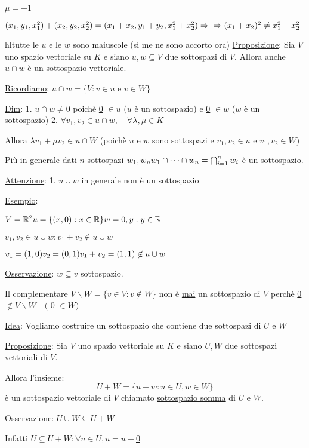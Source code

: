\documentclass{article}
\begin{document}
   $\mu=-1$

   $(x_1,y_1,x_1^2)+(x_2,y_2,x_2^2)=(x_1+x_2,y_1+y_2,x_1^2+x_2^2)\Rightarrow\\\Rightarrow(x_1+x_2)^2\not=x_1^2+x_2^2$

hl{tutte le $u$ e le $w$ sono maiuscole (si me ne sono accorto ora)}
\ul{Proposizione}: Sia $V$ uno spazio vettoriale su $K$ e siano $u,w\subseteq V$ due sottospazi di $V$. Allora anche $u\cap w$ è un sottospazio vettoriale.

\ul{Ricordiamo}: $u\cap w=\{V:v\in u$ e $v\in W\}$

\ul{Dim}:
1. $u\cap w\not=0$ poichè \ul{0} $\in u$ ($u$ è un sottospazio) e \ul{0} $\in w$ ($w$ è un sottospazio)
2. $\forall v_1,v_2\in u\cap w,\quad\forall\lambda,\mu\in K$

   Allora $\lambda v_1+\mu v_2\in u\cap W$ (poichè $u$ e $w$ sono sottospazi e $v_1,v_2\in u$ e $v_1,v_2\in W$)

Più in generale dati $n$ sottospazi $w_1,w_n\\w_1\cap\cdots\cap w_n=\bigcap^n_{i=1}w_i$ è un sottospazio.

\ul{Attenzione}:
1. $u\cup w$ in generale non è un sottospazio

   \ul{Esempio}:

   $V=\mathbb{R}^2\\u=\{(x,0):x\in\mathbb{R}\}\\w={0,y}:y\in\mathbb{R}$

   $v_1,v_2\in u\cup w:v_1+v_2\not\in u\cup w$

   $v_1=(1,0)\\v_2=(0,1)\\v_1+v_2=(1,1)\not\in u\cup w$

\ul{Osservazione}: $w\subseteq v$ sottospazio.

Il complementare $V\backslash W=\{v\in V:v\not\in W\}$ non è \ul{mai} un sottospazio di $V$ perchè \ul{0} $\not\in V\backslash W\quad($ \ul{0} $\in W)$

\ul{Idea}: Vogliamo costruire un sottospazio che contiene due sottospazi di $U$ e $W$

\ul{Proposizione}: Sia $V$ uno spazio vettoriale su $K$ e siano $U,W$ due sottospazi vettoriali di $V$.

Allora l'insieme:
$$U+W=\{u+w:u\in U,w\in W\}$$
è un sottospazio vettoriale di $V$ chiamato \ul{sottospazio somma} di $U$ e $W$.

\ul{Osservazione}: $U\cup W\subseteq U+W$

  Infatti $U\subseteq U+W:\forall u\in U,u=u+$\ul{0}
\end{document}
